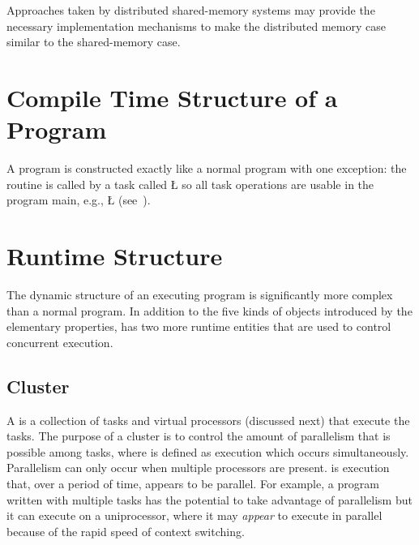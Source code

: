 \documentclass[openright,twoside]{report}
\begin{document}
\begin{annotation}
Approaches taken by distributed shared-memory systems may provide the necessary implementation mechanisms to make the distributed memory case similar to the shared-memory case.
\end{annotation}


\section{\texorpdfstring{Compile Time Structure of a \uC Program}{Compile Time Structure of a uC++ Program}}
\label{s:CompileTimeStructureuCProgram}

A \uC program is constructed exactly like a normal \CC program with one exception:
the  routine is called by a \uC task called \LGinlinetrue\LGbegin\lgrinde\L{}\endlgrinde\LGend{} so all \uC task operations are usable in the program main, e.g., \LGinlinetrue\LGbegin\lgrinde\L{}\endlgrinde\LGend{} (see~).


\section{\texorpdfstring{\uC Runtime Structure}{uC++ Runtime Structure}}

The dynamic structure of an executing \uC program is significantly more complex than a normal \CC program.
In addition to the five kinds of objects introduced by the elementary properties, \uC has two more runtime entities that are used to control concurrent execution.


\subsection{Cluster}
\label{s:RuntimeStructureCluster}

A  is a collection of tasks and virtual processors (discussed next) that execute the tasks.
The purpose of a cluster is to control the amount of parallelism that is possible among tasks, where  is defined as execution which occurs simultaneously.
Parallelism can only occur when multiple processors are present.
 is execution that, over a period of time, appears to be parallel.
For example, a program written with multiple tasks has the potential to take advantage of parallelism but it can execute on a uniprocessor, where it may \emph{appear} to execute in parallel because of the rapid speed of context switching.
\end{document}
